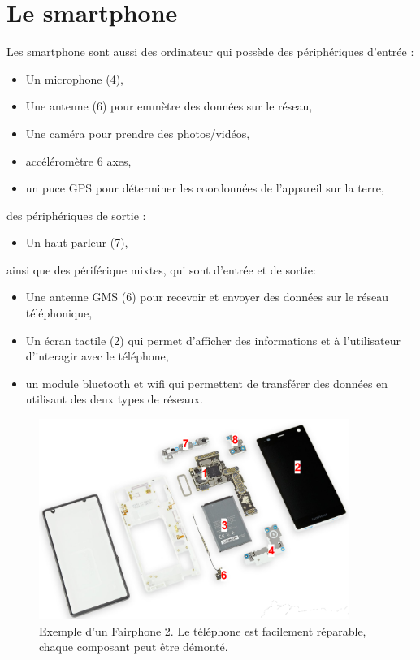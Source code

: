 \section{Le smartphone}
Les smartphone sont aussi des ordinateur qui possède des périphériques d'entrée :
\begin{itemize}
	\item Un microphone (4),
	\item Une antenne (6) pour emmètre des données sur le réseau,
	\item Une caméra pour prendre des photos/vidéos,
	\item accéléromètre 6 axes,
	\item un puce GPS pour déterminer les coordonnées de l'appareil sur la terre,
\end{itemize}
des périphériques de sortie :
\begin{itemize}
	\item Un haut-parleur (7),
\end{itemize}
ainsi que des périférique mixtes, qui sont d'entrée et de sortie: 
\begin{itemize}
	\item Une antenne GMS (6) pour recevoir et envoyer des données sur le réseau téléphonique,
	\item Un écran tactile (2) qui permet d'afficher des informations et à l'utilisateur d'interagir avec le téléphone,
	\item  un module bluetooth et wifi qui permettent de transférer des données en utilisant des deux types de réseaux.
\end{itemize}

\begin{figure}[h!]
	\centering
	\includegraphics[width=0.9\textwidth]{Images/ordinateur/fairphone}
	\caption{Exemple d'un Fairphone 2. Le téléphone est facilement réparable, chaque composant peut être démonté.}
\end{figure}

